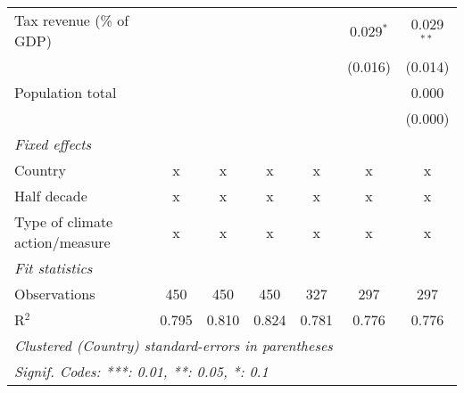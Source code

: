 \begin{tabular}{lcccccc}
   Tax revenue (\% of GDP)                &         &                &                &                & 0.029$^{*}$    & 0.029$^{**}$\\   
                                          &         &                &                &                & (0.016)        & (0.014)\\   
   Population total                       &         &                &                &                &                & 0.000\\   
                                          &         &                &                &                &                & (0.000)\\   
   \emph{Fixed effects}\\
   Country                                & x       & x              & x              & x              & x              & x\\  
   Half decade                            & x       & x              & x              & x              & x              & x\\  
   Type of climate action/measure         & x       & x              & x              & x              & x              & x\\  
   \midrule \emph{Fit statistics}\\
   Observations                           & 450     & 450            & 450            & 327            & 297            & 297\\  
   R$^2$                                  & 0.795   & 0.810          & 0.824          & 0.781          & 0.776          & 0.776\\  
   \midrule
   \multicolumn{7}{l}{\emph{Clustered (Country) standard-errors in parentheses}}\\
   \multicolumn{7}{l}{\emph{Signif. Codes: ***: 0.01, **: 0.05, *: 0.1}}\\
\end{tabular}
\par\endgroup


